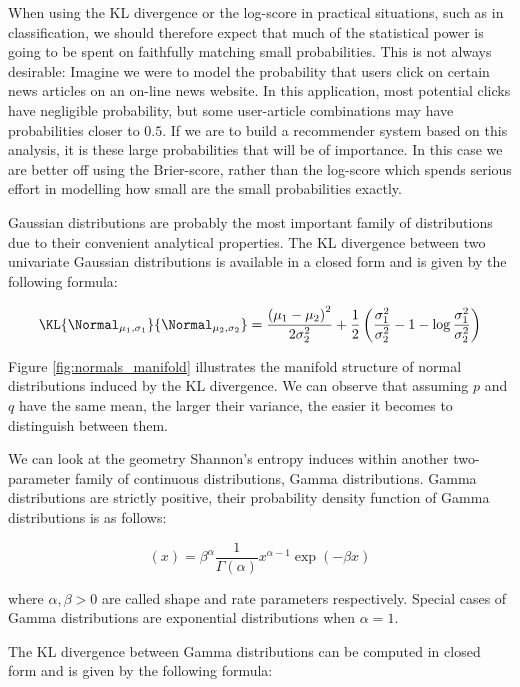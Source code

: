 When using the KL divergence or the log-score in practical situations, such as in classification, we should therefore expect that much of the statistical power is going to be spent on faithfully matching small probabilities. This is not always desirable: Imagine we were to model the probability that users click on certain news articles on an on-line news website. In this application, most potential clicks have negligible probability, but some user-article combinations may have probabilities closer to $0.5$. If we are to build a recommender system based on this analysis, it is these large probabilities that will be of importance. In this case we are better off using the Brier-score, rather than the log-score which spends serious effort in modelling how small are the small probabilities exactly.

Gaussian distributions are probably the most important family of distributions due to their convenient analytical properties. 
The KL divergence between two univariate Gaussian distributions is available in a closed form and is given by the following formula:

\begin{equation}
	\KL{\Normal_{\mu_1,\sigma_1}}{\Normal_{\mu_2,\sigma_2}} = \frac{\left(\mu_1 - \mu_2\right)^2}{2\sigma_2^2} + \frac{1}{2}\left(\frac{\sigma_1^2}{\sigma_2^2} - 1 - \log\frac{\sigma_1^2}{\sigma_2^2}\right)
\end{equation}


Figure \ref{fig:normals_manifold} illustrates the manifold structure of normal distributions induced by the KL divergence. We can observe that assuming $p$ and $q$ have the same mean, the larger their variance, the easier it becomes to distinguish between them.

We can look at the geometry Shannon's entropy induces within another two-parameter family of continuous distributions, Gamma distributions. Gamma distributions are strictly positive, their probability density function of Gamma distributions is as follows:

\begin{equation}
(x) = \beta^{\alpha}\frac{1}{\Gamma(\alpha)} x^{\alpha-1} \exp(-\beta x)
\end{equation}

where $\alpha,\beta > 0$ are called shape and rate parameters respectively. Special cases of Gamma distributions are exponential distributions when $\alpha=1$.

The KL divergence between Gamma distributions can be computed in closed form and is given by the following formula:

